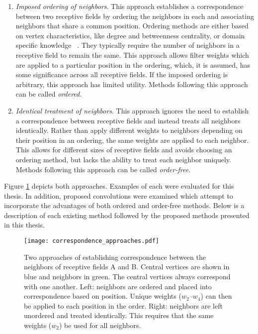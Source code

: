 \begin{enumerate}
	\item \emph{Imposed ordering of neighbors}. This approach establishes a correspondence between two receptive fields by ordering the neighbors in each and associating neighbors that share a common position. 
	Ordering methods are either based on vertex characteristics, like degree and betweenness centrality, or domain specific knowledge ~\cite{niepert2016, duvenaud2015}.
	They typically require the number of neighbors in a receptive field to remain the same.
	This approach allows filter weights which are applied to a particular position in the ordering, which, it is assumed, has some significance across all receptive fields.
	If the imposed ordering is arbitrary, this approach has limited utility.
	Methods following this approach can be called \emph{ordered}.
	
	\item \emph{Identical treatment of neighbors}. This approach ignores the need to establish a correspondence between receptive fields and instead treats all neighbors identically.
	Rather than apply different weights to neighbors depending on their position in an ordering, the same weights are applied to each neighbor.
	This allows for different sizes of receptive fields and avoids choosing an ordering method, but lacks the ability to treat each neighbor uniquely.
	Methods following this approach can be called \emph{order-free}.
\end{enumerate}

Figure \ref{fig:correspondence_approaches} depicts both approaches.
Examples of each were evaluated for this thesis.
In addition, proposed convolutions were examined which attempt to incorporate the advantages of both ordered and order-free methods.
Below is a description of each existing method followed by the proposed methods presented in this thesis. 

\begin{figure}
	\centering
	\texttt{[image: correspondence\_approaches.pdf]}
	\caption{Two approaches of establishing correspondence between the neighbors of receptive fields A and B. Central vertices are shown in blue and neighbors in green. The central vertices always correspond with one another. Left: neighbors are ordered and placed into correspondence based on position. Unique weights (\emph{$w_2$--$w_4$}) can then be applied to each position in the order. Right: neighbors are left unordered and treated identically. This requires that the same weights (\emph{$w_2$}) be used for all neighbors.}
	\label{fig:correspondence_approaches}
\end{figure}



